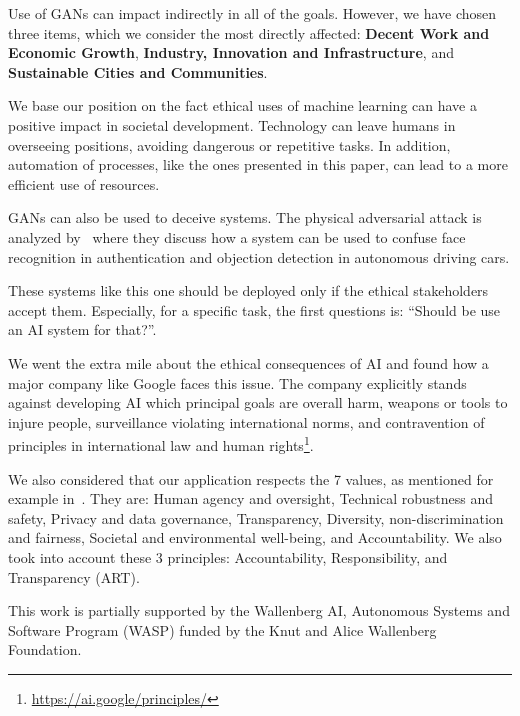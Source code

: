 \documentclass[12pt]{article}
\begin{document}
    Use of GANs can impact indirectly in all of the goals.
    However, we have chosen three items, which we consider the most directly affected:
    \textbf{Decent Work and Economic Growth}, \textbf{Industry, Innovation and Infrastructure}, and
    \textbf{Sustainable Cities and Communities}.

    We base our position on the fact ethical uses of machine learning can have a positive impact in societal development.
    Technology can leave humans in overseeing positions, avoiding dangerous or repetitive tasks.
    In addition, automation of processes, like the ones presented in this paper, can lead to a more efficient use of resources.

    GANs can also be used to deceive systems.
    The physical adversarial attack is analyzed by~\cite{arxiv:1812.10217} where they discuss
    how a system can be used to confuse face recognition in authentication and objection detection in autonomous driving cars.

    These systems like this one should be deployed only if the ethical stakeholders accept them.
    Especially, for a specific task, the first questions is: ``Should be use an AI system for that?''.

    We went the extra mile about the ethical consequences of AI and found how a major company like Google faces this issue.
    The company explicitly stands against developing AI which principal goals are overall harm, weapons or tools to injure people, surveillance violating international norms, and contravention of principles in international law and human rights\footnote{\url{https://ai.google/principles/}}.

    We also considered that our application respects the 7 values, as mentioned for example in~\cite{easa:20210401.01}.
    They are: Human agency and oversight, Technical robustness and safety, Privacy and data governance, Transparency, Diversity, non-discrimination and fairness, Societal and environmental well-being, and Accountability.
    We also took into account these 3 principles: Accountability, Responsibility, and Transparency (ART)\cite{doi:10.1145/3278721.3278745}.

    \begin{ack}
        This work is partially supported by the Wallenberg AI, Autonomous Systems and Software Program (WASP) funded by the Knut and Alice Wallenberg Foundation.
    \end{ack}

    

    
\end{document}

